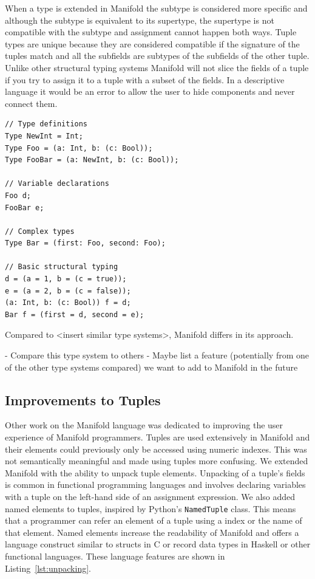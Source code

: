 When a type is extended in Manifold the subtype is considered more specific and although the subtype is equivalent to its supertype, the supertype is not compatible with the subtype and assignment cannot happen both ways. Tuple types are unique because they are considered compatible if the signature of the tuples match and all the subfields are subtypes of the subfields of the other tuple. Unlike other structural typing systems Manifold will not slice the fields of a tuple if you
try to assign it to a tuple with a subset of the fields. In a descriptive language it would be an error to allow the user to hide components and never connect them.

\begin{lstlisting}[label=lst:types,caption=Example of types in a Manifold file]
// Type definitions
Type NewInt = Int;
Type Foo = (a: Int, b: (c: Bool));
Type FooBar = (a: NewInt, b: (c: Bool));

// Variable declarations
Foo d;
FooBar e;

// Complex types
Type Bar = (first: Foo, second: Foo);

// Basic structural typing
d = (a = 1, b = (c = true));
e = (a = 2, b = (c = false));
(a: Int, b: (c: Bool)) f = d;
Bar f = (first = d, second = e);
\end{lstlisting}

Compared to <insert similar type systems>, Manifold differs in its approach.

- Compare this type system to others
- Maybe list a feature (potentially from one of the other type systems compared) we want to add to Manifold in the future

\subsection{Improvements to Tuples}

Other work on the Manifold language was dedicated to improving the user experience
of Manifold programmers. Tuples are used extensively in Manifold and their
elements could previously only be accessed using numeric indexes. This was not
semantically meaningful and made using tuples more confusing. We extended
Manifold with the ability to unpack tuple elements. Unpacking of a tuple's
fields is common in functional programming languages and involves declaring
variables with a tuple on the left-hand side of an assignment expression. We
also added named elements to tuples, inspired by Python's \texttt{NamedTuple}
class. This means that a programmer can refer an element of a tuple using a
index or the name of that element. Named elements increase the readability of
Manifold and offers a language construct similar to structs in C or record
data types in Haskell or other functional languages. These language features
are shown in Listing~\ref{lst:unpacking}.


